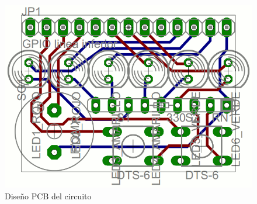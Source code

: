 \begin{figure}[h]
  \centering
    \includegraphics[width=14cm]{graphs/pcb.png}
  \caption{Diseño PCB del circuito}
  \label{fig:pcb}
\end{figure}

\chapterend
